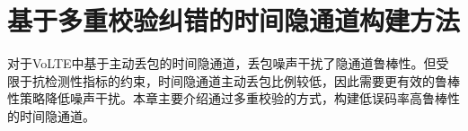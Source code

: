 \chapter{基于多重校验纠错的时间隐通道构建方法}
\label{chap:hash}

对于VoLTE中基于主动丢包的时间隐通道，丢包噪声干扰了隐通道鲁棒性。但受限于抗检测性指标的约束，时间隐通道主动丢包比例较低，因此需要更有效的鲁棒性策略降低噪声干扰。本章主要介绍通过多重校验的方式，构建低误码率高鲁棒性的时间隐通道。






